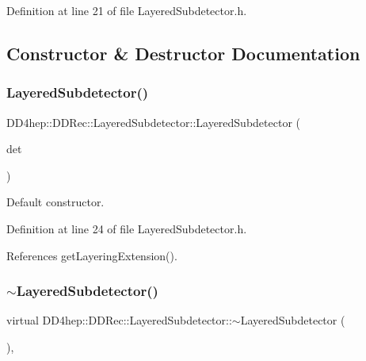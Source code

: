 Definition at line 21 of file Layered\+Subdetector.\+h.



\subsection{Constructor \& Destructor Documentation}
\hypertarget{class_d_d4hep_1_1_d_d_rec_1_1_layered_subdetector_a0897f69fe293527bc70f91840db345ea}{}\label{class_d_d4hep_1_1_d_d_rec_1_1_layered_subdetector_a0897f69fe293527bc70f91840db345ea} 
\subsubsection{\texorpdfstring{Layered\+Subdetector()}{LayeredSubdetector()}}
{\footnotesize\ttfamily D\+D4hep\+::\+D\+D\+Rec\+::\+Layered\+Subdetector\+::\+Layered\+Subdetector (\begin{DoxyParamCaption}\item[{const \hyperlink{class_d_d4hep_1_1_geometry_1_1_det_element}{Geometry\+::\+Det\+Element} \&}]{det }\end{DoxyParamCaption})\hspace{0.3cm}{\ttfamily [inline]}}



Default constructor. 



Definition at line 24 of file Layered\+Subdetector.\+h.



References get\+Layering\+Extension().

\hypertarget{class_d_d4hep_1_1_d_d_rec_1_1_layered_subdetector_a8fd9a44526c4856456d59fbb36efd6af}{}\label{class_d_d4hep_1_1_d_d_rec_1_1_layered_subdetector_a8fd9a44526c4856456d59fbb36efd6af} 
\subsubsection{\texorpdfstring{$\sim$\+Layered\+Subdetector()}{~LayeredSubdetector()}}
{\footnotesize\ttfamily virtual D\+D4hep\+::\+D\+D\+Rec\+::\+Layered\+Subdetector\+::$\sim$\+Layered\+Subdetector (\begin{DoxyParamCaption}{ }\end{DoxyParamCaption})\hspace{0.3cm}{\ttfamily [inline]}, {\ttfamily [virtual]}}



